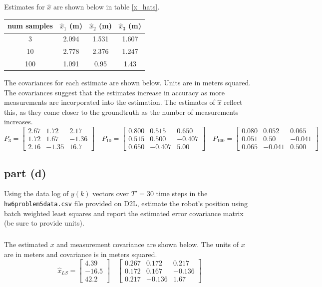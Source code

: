 \documentclass[11pt]{article}
\begin{document}
\subparagraph*{}
Estimates for $\hat{x}$ are shown below in table \ref{x_hats}.
\begin{center}
\begin{tabular}{ c | c | c | c }
 num samples & $\hat{x}_1$ (m)& $\hat{x}_2$ (m) & $\hat{x}_3$ (m) \\ 
 \hline
 3 & 2.094 & 1.531 & 1.607 \\  
 10 & 2.778 & 2.376 & 1.247 \\
 100 & 1.091 & 0.95 & 1.43 \\ 
 \hline
\end{tabular}
\label{x_hats}
\end{center}
The covariances for each estimate are shown below. Units are in meters squared. The covariances suggest that the estimates increase in accuracy as more measurements are incorporated into the estimation. The estimates of $\hat{x}$ reflect this, as they come closer to the groundtruth as the number of measurements increases.
\begin{equation*}
	P_{3} = \begin{bmatrix} 2.67&1.72&2.17\\1.72&1.67&-1.36\\2.16&-1.35&16.7 \end{bmatrix} \quad
	P_{10} = \begin{bmatrix} 0.800&0.515&0.650\\0.515&0.500&-0.407\\0.650&-0.407&5.00 \end{bmatrix} \quad
	P_{100} = \begin{bmatrix} 0.080&0.052&0.065\\0.051&0.50&-0.041\\0.065&-0.041&0.500 \end{bmatrix}
\end{equation*}

\subsection*{part (d)}
Using the data log of $y(k)$ vectors over $T'=30$ time steps in the \texttt{hw6problem5data.csv} file provided on D2L, estimate the robot's position using batch weighted least squares and report the estimated error covariance matrix (be sure to provide units).

\subparagraph*{}
The estimated $x$ and measurement covariance are shown below. The units of $x$ are in meters and covariance is in meters squared.
\begin{equation*}
	\hat{x}_{LS} = \begin{bmatrix} 4.39 \\ -16.5 \\ 42.2 \end{bmatrix} \quad 
	\begin{bmatrix} 0.267 & 0.172 & 0.217 \\ 0.172 & 0.167 & -0.136 \\ 0.217 & -0.136 & 1.67 \end{bmatrix}
\end{equation*}
\end{document}
